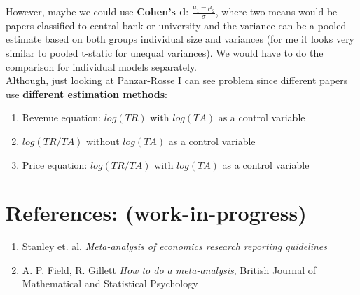 \documentclass{article}
\begin{document}
\newline \noindent
However, maybe we could use \textbf{Cohen’s d}: $\frac{\mu_1 - \mu_2}{\sigma}$, where two means would be papers classified to central bank or university and the variance can be a pooled estimate based on both groups individual size and variances (for me it looks very similar to pooled t-static for unequal variances). We would have to do the comparison for individual models separately. \\

\newline \noindent
Although, just looking at Panzar-Rosse I can see problem since different papers use \textbf{different estimation methods}:
\begin{enumerate}
    \item Revenue equation: $log(TR)$ with $log(TA)$ as a control variable
    \item $log(TR/TA)$  without $log(TA)$ as a control variable
    \item Price equation: $log(TR/TA)$ with $log(TA)$ as a control variable
\end{enumerate}

\newpage

\section*{References: (work-in-progress)}

\begin{enumerate}
    \item Stanley et. al. \textit{Meta-analysis of economics research reporting guidelines}
    \item A. P. Field, R. Gillett \textit{How to do a meta-analysis}, British Journal of Mathematical and Statistical Psychology
\end{enumerate}
\end{document}
